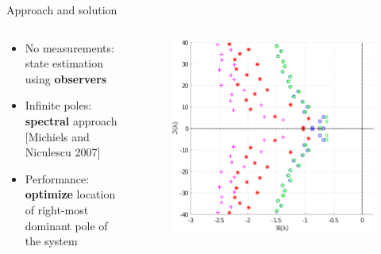 \documentclass[10pt]{beamer}
\begin{document}
\begin{frame}{Approach and solution}
\begin{columns}
\begin{column}{0.4\textwidth}
	\begin{itemize}\setlength\itemsep{3em}
	\item No measurements: state estimation using \textbf{observers}
	\item Infinite poles: \textbf{spectral} approach [Michiels and Niculescu 2007]
	\item Performance: \textbf{optimize} location of right-most dominant pole of the system
	\end{itemize}
\end{column}
	\begin{column}{0.6\textwidth}
	\begin{figure}[ht]\centering
		\includegraphics[width=1.05\textwidth]{images/ClosedLoopPolesNeutral.pdf}
	\end{figure}
	\end{column}
\end{columns}
\end{frame}
\end{document}
